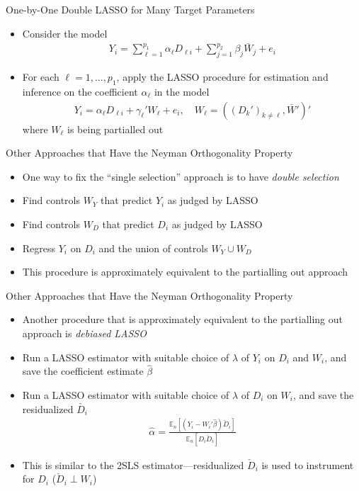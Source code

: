 \documentclass[aspectratio=1610,12pt,xcolor=dvipsnames]{beamer}
\begin{document}
\begin{frame}{One-by-One Double LASSO for Many Target Parameters}

\begin{itemize}
    \item Consider the model
    \begin{align*}
        Y_i = \sum_{\ell=1}^{p_1} \alpha_{\ell}D_{\ell i} + \sum_{j=1}^{p_2} \beta_j \bar W_j + e_i
    \end{align*}
    \item For each $\ell = 1,...,p_1$, apply the LASSO procedure for estimation and inference on the coefficient $\alpha_{\ell}$ in the model
    \begin{align*}
        Y_i = \alpha_{\ell} D_{\ell i} + \gamma_{\ell}'W_{\ell} + e_i, \quad W_{\ell} = ((D_{k}')_{k\neq\ell},\bar{W}')'
    \end{align*}
    where $W_{\ell}$ is being partialled out 
\end{itemize}
\end{frame}

\begin{frame}{Other Approaches that Have the Neyman Orthogonality Property}

\begin{itemize}
    \item One way to fix the ``single selection'' approach is to have \textit{double selection}
    \item Find controls $W_{Y}$ that predict $Y_i$ as judged by LASSO
    \item Find controls $W_{D}$ that predict $D_i$ as judged by LASSO
    \item Regress $Y_i$ on $D_i$ and the union of controls $W_{Y} \cup W_{D}$
    \item This procedure is approximately equivalent to the partialling out approach
\end{itemize}
\end{frame}

\begin{frame}{Other Approaches that Have the Neyman Orthogonality Property}

\begin{itemize}
    \item Another procedure that is approximately equivalent to the partialling out approach is \textit{debiased LASSO}
    \item Run a LASSO estimator with suitable choice of $\lambda$ of $Y_i$ on $D_i$ and $W_i$, and save the coefficient estimate $\hat{\beta}$
    \item Run a LASSO estimator with suitable choice of $\lambda$ of $D_i$ on $W_i$, and save the residualized $\check{D_i}$
    \begin{align*}
        \hat{\alpha} = \frac{\mathbb{E}_n[(Y_i - W_i'\hat \beta) \check D_i]}{\mathbb{E}_n[D_i\check D_i]}
    \end{align*}
    \item This is similar to the 2SLS estimator—residualized $\check D_i$ is used to instrument for $D_i$ ($\check D_i \perp W_i$)
\end{itemize}
\end{frame}
\end{document}
